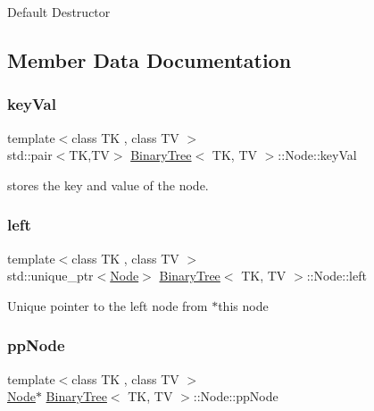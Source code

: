 Default Destructor 

\subsection{Member Data Documentation}
\mbox{\label{structBinaryTree_1_1Node_a072d4d35344db07dc1bdec47d78e3a63}} 
\subsubsection{\texorpdfstring{keyVal}{keyVal}}
{\footnotesize\ttfamily template$<$class TK , class TV $>$ \\
std\+::pair$<$TK,TV$>$ \mbox{\hyperlink{classBinaryTree}{Binary\+Tree}}$<$ TK, TV $>$\+::Node\+::key\+Val}

stores the key and value of the node. \mbox{\label{structBinaryTree_1_1Node_a4287689cdd537564e846184c76f084f7}} 
\subsubsection{\texorpdfstring{left}{left}}
{\footnotesize\ttfamily template$<$class TK , class TV $>$ \\
std\+::unique\+\_\+ptr$<$\mbox{\hyperlink{structBinaryTree_1_1Node}{Node}}$>$ \mbox{\hyperlink{classBinaryTree}{Binary\+Tree}}$<$ TK, TV $>$\+::Node\+::left}

Unique pointer to the left node from $\ast$this node \mbox{\label{structBinaryTree_1_1Node_a855b9a95346f66f45013ca406813a4d3}} 
\subsubsection{\texorpdfstring{ppNode}{ppNode}}
{\footnotesize\ttfamily template$<$class TK , class TV $>$ \\
\mbox{\hyperlink{structBinaryTree_1_1Node}{Node}}$\ast$ \mbox{\hyperlink{classBinaryTree}{Binary\+Tree}}$<$ TK, TV $>$\+::Node\+::pp\+Node}

